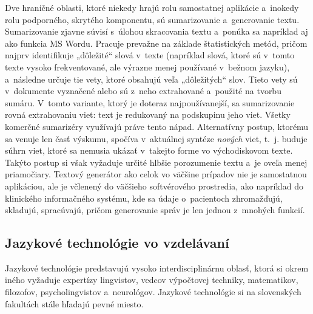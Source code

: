 \begin{multicols}{2}

Dve hraničné oblasti, ktoré niekedy hrajú rolu samostatnej aplikácie a~inokedy rolu podporného, skrytého komponentu, sú sumarizovanie a~generovanie textu. Sumarizovanie zjavne súvisí s~úlohou skracovania textu a~ponúka sa napríklad aj ako funkcia MS Wordu. Pracuje prevažne na základe štatistických metód, pričom najprv identifikuje „dôležité“ slová v~texte (napríklad slová, ktoré sú v~tomto texte vysoko frekventované, ale výrazne menej používané v~bežnom jazyku), a~následne určuje tie vety, ktoré obsahujú veľa „dôležitých“ slov. Tieto vety sú v~dokumente vyznačené alebo sú z~neho extrahované a~použité na tvorbu sumáru. V~tomto variante, ktorý je doteraz najpoužívanejší, sa sumarizovanie rovná extrahovaniu viet: text je redukovaný na podskupinu jeho viet. Všetky komerčné sumarizéry využívajú práve tento nápad. Alternatívny postup, ktorému sa venuje len časť výskumu, spočíva v~aktuálnej syntéze \emph{nových} viet, t.~j. buduje súhrn viet, ktoré sa nemusia ukázať v~takejto forme vo východiskovom texte. Takýto postup si však vyžaduje určité hlbšie porozumenie textu a~je oveľa menej priamočiary. Textový generátor ako celok vo väčšine prípadov nie je samostatnou aplikáciou, ale je včlenený do väčšieho softvérového prostredia, ako napríklad do klinického informačného systému, kde sa údaje o~pacientoch zhromažďujú, skladujú, spracúvajú, pričom generovanie správ je len jednou z~mnohých funkcií. 

\subsection{Jazykové technológie vo vzdelávaní}
Jazykové technológie predstavujú vysoko interdisciplinárnu oblasť, ktorá si okrem iného vyžaduje expertízy lingvistov, vedcov výpočtovej techniky, matematikov, filozofov, psycholingvistov a~neurológov. Jazykové technológie si na slovenských fakultách stále hľadajú pevné miesto.



\end{multicols}
